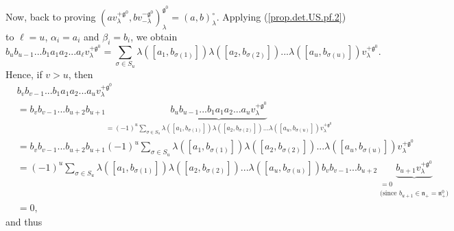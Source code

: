 \documentclass
[numbers=enddot,12pt,final,onecolumn,german,notitlepage]{scrartcl}%
\theoremstyle{definition}
\begin{document}
Now, back to proving $\left(  av_{\lambda}^{+\mathfrak{g}^{0}},bv_{-\lambda
}^{-\mathfrak{g}^{0}}\right)  _{\lambda}^{\mathfrak{g}^{0}}=\left(
a,b\right)  _{\lambda}^{\circ}$. Applying (\ref{prop.det.US.pf.2}) to $\ell
=u$, $\alpha_{i}=a_{i}$ and $\beta_{i}=b_{i}$, we obtain%
\[
b_{u}b_{u-1}...b_{1}a_{1}a_{2}...a_{\ell}v_{\lambda}^{+\mathfrak{g}^{0}}%
=\sum\limits_{\sigma\in S_{u}}\lambda\left(  \left[  a_{1},b_{\sigma\left(
1\right)  }\right]  \right)  \lambda\left(  \left[  a_{2},b_{\sigma\left(
2\right)  }\right]  \right)  ...\lambda\left(  \left[  a_{u},b_{\sigma\left(
u\right)  }\right]  \right)  v_{\lambda}^{+\mathfrak{g}^{0}}.
\]
Hence, if $v>u$, then%
\begin{align*}
&  b_{v}b_{v-1}...b_{1}a_{1}a_{2}...a_{u}v_{\lambda}^{+\mathfrak{g}^{0}}\\
&  =b_{v}b_{v-1}...b_{u+2}b_{u+1}\underbrace{b_{u}b_{u-1}...b_{1}a_{1}%
a_{2}...a_{u}v_{\lambda}^{+\mathfrak{g}^{0}}}_{=\left(  -1\right)  ^{u}%
\sum\limits_{\sigma\in S_{u}}\lambda\left(  \left[  a_{1},b_{\sigma\left(
1\right)  }\right]  \right)  \lambda\left(  \left[  a_{2},b_{\sigma\left(
2\right)  }\right]  \right)  ...\lambda\left(  \left[  a_{u},b_{\sigma\left(
u\right)  }\right]  \right)  v_{\lambda}^{+\mathfrak{g}^{0}}}\\
&  =b_{v}b_{v-1}...b_{u+2}b_{u+1}\left(  -1\right)  ^{u}\sum\limits_{\sigma\in
S_{u}}\lambda\left(  \left[  a_{1},b_{\sigma\left(  1\right)  }\right]
\right)  \lambda\left(  \left[  a_{2},b_{\sigma\left(  2\right)  }\right]
\right)  ...\lambda\left(  \left[  a_{u},b_{\sigma\left(  u\right)  }\right]
\right)  v_{\lambda}^{+\mathfrak{g}^{0}}\\
&  =\left(  -1\right)  ^{u}\sum\limits_{\sigma\in S_{u}}\lambda\left(  \left[
a_{1},b_{\sigma\left(  1\right)  }\right]  \right)  \lambda\left(  \left[
a_{2},b_{\sigma\left(  2\right)  }\right]  \right)  ...\lambda\left(  \left[
a_{u},b_{\sigma\left(  u\right)  }\right]  \right)  b_{v}b_{v-1}%
...b_{u+2}\underbrace{b_{u+1}v_{\lambda}^{+\mathfrak{g}^{0}}}%
_{\substack{=0\\\text{(since }b_{u+1}\in\mathfrak{n}_{+}=\mathfrak{n}_{+}%
^{0}\text{)}}}\\
&  =0,
\end{align*}
and thus%
\end{document}
